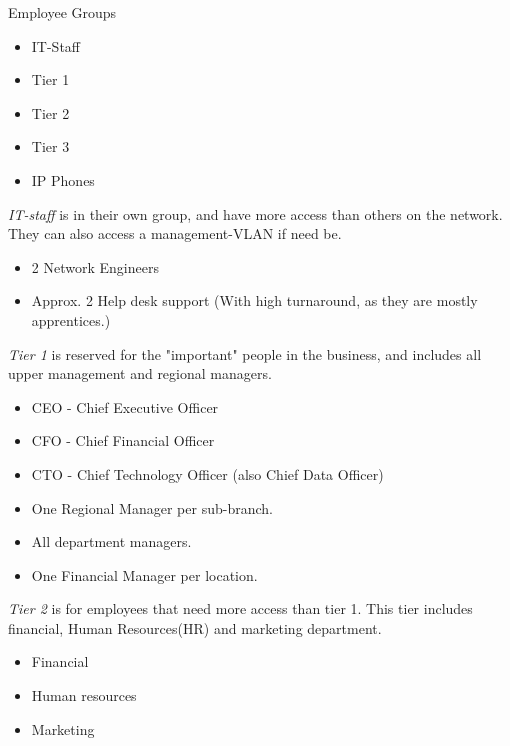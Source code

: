 Employee Groups
\begin{itemize}[noitemsep] 
    \item IT-Staff
    \item Tier 1
    \item Tier 2
    \item Tier 3
    \item IP Phones
\end{itemize}
\hfill

\emph{IT-staff} is in their own group, and have more access than others on the network.
They can also access a management-VLAN if need be.
\begin{itemize}[noitemsep]
    \item 2 Network Engineers
    \item Approx. 2 Help desk support (With high turnaround, as they are mostly apprentices.)

\end{itemize}

\hfill

\emph{Tier 1} is reserved for the "important" people in the business, and includes all upper management and regional managers.
\begin{itemize}[noitemsep]
    \item CEO - Chief Executive Officer
    \item CFO - Chief Financial Officer
    \item CTO - Chief Technology Officer (also Chief Data Officer)
    \item One Regional Manager per sub-branch.
    \item All department managers.
    \item One Financial Manager per location.
\end{itemize}

\hfill

\emph{Tier 2} is for employees that need more access than tier 1. This tier includes financial, Human Resources(HR) and marketing department.
\begin{itemize}[noitemsep]
    \item Financial
    \item Human resources
    \item Marketing
\end{itemize}

